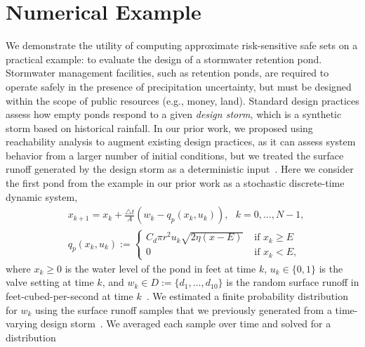 \documentclass[letterpaper, 10 pt, conference]{ieeeconf}  %
\begin{document}
\section{Numerical Example}
\label{sec::ex}
We demonstrate the utility of computing approximate risk-sensitive safe sets on a practical example:
to evaluate the design of a stormwater retention pond. 
Stormwater management facilities, such as retention ponds, are required to operate safely 
in the presence of precipitation uncertainty, but must be designed within the scope of public resources (e.g., money, land). 
Standard design practices assess how empty ponds respond to a given \textit{design storm},
which is a synthetic storm based on historical rainfall.  
In our prior work, we proposed using reachability analysis to augment existing design practices, as it can assess 
system behavior from a larger number of initial conditions, but we treated the surface runoff generated by the design storm as a deterministic input~\cite{sustech}.
Here we consider the first pond from the example in our prior work as a stochastic discrete-time dynamic system,
\begin{equation}\begin{aligned}
& x_{k+1} = x_k + \frac{\triangle t}{A} (w_k - q_p(x_k, u_k)), \text{ }k = 0, \dots, N-1, \\
& q_p(x_k,u_k) := \begin{cases} C_d \pi r^2 u_k \sqrt{ 2\eta(x-E) } & \text{ if } x_k \geq E \\
						0 & \text{ if } x_k < E, \end{cases}
\end{aligned}\label{watersys}\end{equation}
where $x_k \geq 0$ is the water level of the pond in feet at time $k$, $u_k \in \{0, 1\}$ is the valve setting at time $k$,
and $w_k \in D := \{d_1, \dots, d_{10}\}$ is the random surface runoff in feet-cubed-per-second at time $k$~\cite{sustech}.\footnotemark
{} 
We estimated a finite probability distribution for $w_k$ using the surface runoff samples that we previously generated from a time-varying design storm~\cite{sustech}. 
We averaged each sample over time and solved for a distribution
\end{document}
